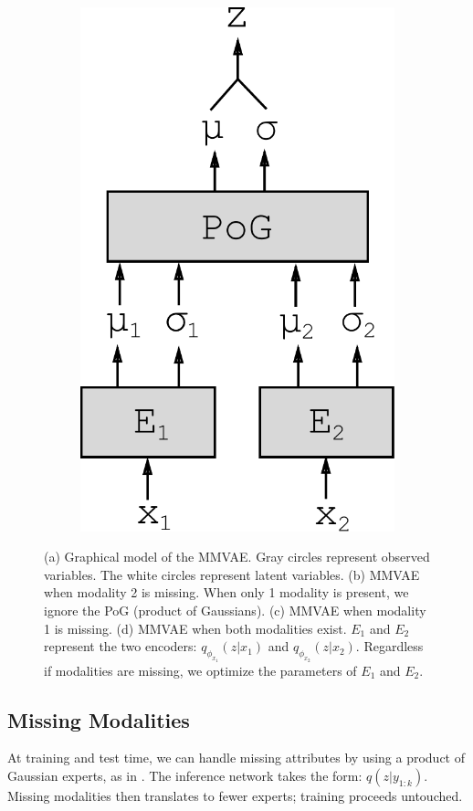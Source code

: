 \documentclass{article}
\begin{document}
\begin{figure}[h!]
\begin{subfigure}[b]{.15\linewidth}
        \includegraphics[width=.75\linewidth]{modelv3}
        \caption{}
        \label{fig:diagram:modelv3}
    \end{subfigure}
    \caption{(a) Graphical model of the MMVAE. Gray circles represent observed variables. The white circles represent latent variables. (b) MMVAE when modality 2 is missing. When only 1 modality is present, we ignore the PoG (product of Gaussians). (c) MMVAE when modality 1 is missing. (d) MMVAE when both modalities exist. $E_{1}$ and $E_{2}$ represent the two encoders: $q_{\phi_{x_{1}}}(z | x_{1})$ and $q_{\phi_{x_{2}}}(z | x_{2})$. Regardless if modalities are missing, we optimize the parameters of $E_{1}$ and $E_{2}$.}
    \label{fig:diagram}
\end{figure}

\subsection{Missing Modalities} At training and test time, we can handle missing attributes by using a product of Gaussian experts, as in \cite{hinton2006training}. The inference network takes the form: $q(z|y_{1:k})$. Missing modalities then translates to fewer experts; training proceeds untouched. 
\end{document}
